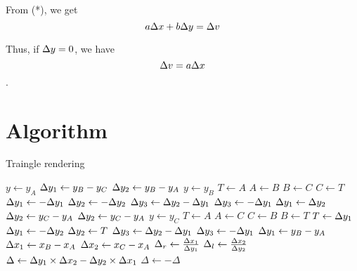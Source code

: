 From (*), we get
$$a \Delta x + b \Delta y = \Delta v$$

Thus, if $\Delta y = 0$, we have $$\Delta v = a \Delta x$$.

\section{Algorithm}

\begin{algorithm}
  \caption{Traingle rendering}
  \begin{algorithmic}[1]
    \State $y \gets y_A$ 
    \State $\Delta y_1 \gets y_B - y_C$
    \State $\Delta y_2 \gets y_B - y_A$
    \State $y \gets y_B$
    \State $T \gets A$
    \State $A \gets B$
    \State $B \gets C$
    \State $C \gets T$
    \State $\Delta y_1 \gets - \Delta y_1$
    \State $\Delta y_2 \gets - \Delta y_2$
    \State $\Delta y_3 \gets \Delta y_2 - \Delta y_1$
    \Else
    \State $\Delta y_3 \gets - \Delta y_1$
    \State $\Delta y_1 \gets \Delta y_2$
    \State $\Delta y_2 \gets y_C - y_A$
    \EndIf
    \Else
    \State $\Delta y_2 \gets y_C - y_A$
    \State $y \gets y_C$
    \State $T \gets A$
    \State $A \gets C$
    \State $C \gets B$
    \State $B \gets T$
    \State $T \gets \Delta y_1$
    \State $\Delta y_1 \gets - \Delta y_2$
    \State $\Delta y_2 \gets T$
    \State $\Delta y_3 \gets \Delta y_2 - \Delta y_1$
    \Else
    \State $\Delta y_3 \gets - \Delta y_1$
    \State $\Delta y_1 \gets y_B - y_A$
    \EndIf
    \EndIf
    \State $\Delta x_1 \gets x_B - x_A$ 
    \State $\Delta x_2 \gets x_C - x_A$ 
    \State $\Delta_{r} \gets \frac{\Delta x_1}{\Delta y_1}$ 
    \EndIf
    \State $\Delta_{l} \gets \frac{\Delta x_2}{\Delta y_2}$ 
    \EndIf
    \State $\Delta \gets \Delta y_1 \times \Delta x_2 - \Delta y_2 \times \Delta x_1$
    \Return {}
    \Else
    \State $\Delta \gets - \Delta$
    \EndIf
    \EndProcedure
  \end{algorithmic}
\end{algorithm}

